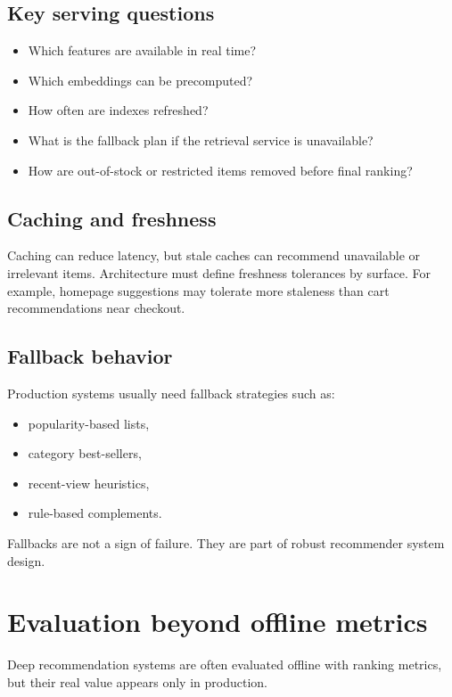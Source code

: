 \subsection{Key serving questions}
\begin{itemize}
  \item Which features are available in real time?
  \item Which embeddings can be precomputed?
  \item How often are indexes refreshed?
  \item What is the fallback plan if the retrieval service is unavailable?
  \item How are out-of-stock or restricted items removed before final ranking?
\end{itemize}

\subsection{Caching and freshness}
Caching can reduce latency, but stale caches can recommend unavailable or irrelevant items.
Architecture must define freshness tolerances by surface.
For example, homepage suggestions may tolerate more staleness than cart recommendations near checkout.

\subsection{Fallback behavior}
Production systems usually need fallback strategies such as:
\begin{itemize}
  \item popularity-based lists,
  \item category best-sellers,
  \item recent-view heuristics,
  \item rule-based complements.
\end{itemize}

Fallbacks are not a sign of failure.
They are part of robust recommender system design.

\section{Evaluation beyond offline metrics}
Deep recommendation systems are often evaluated offline with ranking metrics, but their real value appears only in production.

